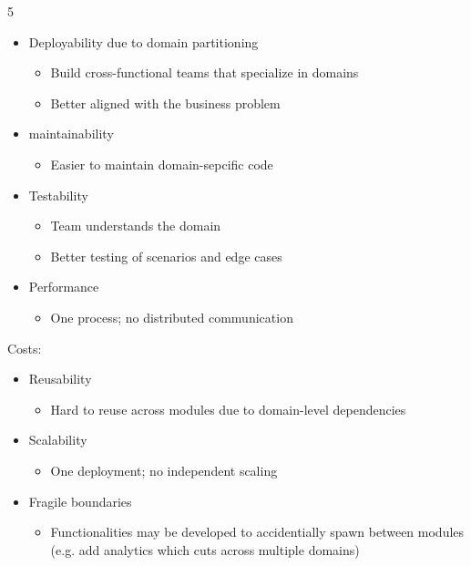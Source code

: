 \documentclass[landscape,a4paper]{extarticle}
\begin{document}
\begin{multicols*}{5}
    \begin{itemize}
        \item Deployability due to domain partitioning
        \begin{itemize}
            \item Build cross-functional teams that specialize in domains
            \item Better aligned with the business problem
        \end{itemize}
        \item maintainability
        \begin{itemize}
            \item Easier to maintain domain-sepcific code
        \end{itemize}
        \item Testability
        \begin{itemize}
            \item Team understands the domain
            \item Better testing of scenarios and edge cases
        \end{itemize}
        \item Performance
        \begin{itemize}
            \item One process; no distributed communication
        \end{itemize}
    \end{itemize}

    Costs:

    \begin{itemize}
        \item Reusability
        \begin{itemize}
            \item Hard to reuse across modules due to domain-level dependencies
        \end{itemize}
        \item Scalability
        \begin{itemize}
            \item One deployment; no independent scaling
        \end{itemize}
        \item Fragile boundaries
        \begin{itemize}
            \item Functionalities may be developed to accidentially spawn between modules (e.g. add analytics which cuts across multiple domains)
        \end{itemize}
    \end{itemize}


\end{multicols*}
\end{document}
